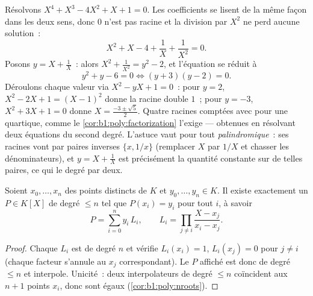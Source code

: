 \begin{example}\label{ex:b1:poly:palindrome}
Résolvons $X^4 + X^3 - 4X^2 + X + 1 = 0$. Les coefficients se lisent
de la même façon dans les deux sens, donc $0$ n'est pas racine et la
division par $X^2$ ne perd aucune solution~:
\[
X^2 + X - 4 + \frac1X + \frac1{X^2} = 0 .
\]
Posons $y = X + \frac1X$~: alors $X^2 + \frac1{X^2} = y^2 - 2$, et
l'équation se réduit à
\[
y^2 + y - 6 = 0 \iff (y + 3)(y - 2) = 0 .
\]
Déroulons chaque valeur via $X^2 - yX + 1 = 0$~: pour $y = 2$, $X^2
- 2X + 1 = (X - 1)^2$ donne la racine double $1$~; pour $y = -3$,
$X^2 + 3X + 1 = 0$ donne $X = \frac{-3 \pm \sqrt5}2$. Quatre racines
comptées avec  pour une quartique, comme
le \cref{cor:b1:poly:factorization} l'exige --- obtenues en résolvant
deux équations du second degré. L'astuce vaut pour tout 
\emph{palindromique}~: ses racines vont par paires inverses $\{x,
1/x\}$ (remplacer $X$ par $1/X$ et chasser les dénominateurs), et $y
= X + \frac1X$ est précisément la quantité constante sur de telles
paires, ce qui  le degré par deux.
\end{example}

\begin{theorem}\label{thm:b1:poly:lagrange}
Soient $x_0, \dots, x_n$ des points distincts de $K$ et $y_0, \dots,
y_n \in K$. Il existe exactement un $P \in K[X]$ de degré $\leq n$ tel
que $P(x_i) = y_i$ pour tout $i$, à
savoir
\[
P = \sum_{i=0}^{n} y_i\, L_i,
\qquad
L_i = \prod_{j \neq i} \frac{X - x_j}{x_i - x_j} .
\]
\end{theorem}

\begin{proof}
Chaque $L_i$ est de degré $n$ et vérifie $L_i(x_i) = 1$, $L_i(x_j) =
0$ pour $j \neq i$ (chaque facteur s'annule au $x_j$ correspondant). Le
$P$ affiché est donc de degré $\leq n$ et interpole. Unicité~: deux
 interpolateurs de degré $\leq n$ coïncident aux $n+1$ points
$x_i$, donc sont égaux (\cref{cor:b1:poly:nroots}).
\end{proof}

